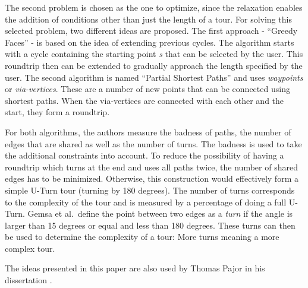 The second problem is chosen as the one to optimize, since the relaxation enables the addition of conditions other than just the length of a tour.
For solving this selected problem, two different ideas are proposed.
The first approach - \enquote{Greedy Faces} - is based on the idea of extending previous cycles.
The algorithm starts with a cycle containing the starting point \textit{s} that can be selected by the user. 
This roundtrip then can be extended to gradually approach the length specified by the user. 
The second algorithm is named \enquote{Partial Shortest Paths} and uses \textit{waypoints} or \textit{via-vertices}.
These are a number of new points that can be connected using shortest paths.
When the via-vertices are connected with each other and the start, they form a roundtrip.


For both algorithms, the authors measure the badness of paths, the number of edges that are shared as well as the number of turns.
The badness is used to take the additional constraints into account. 
To reduce the possibility of having a roundtrip which turns at the end and uses all paths twice, the number of shared edges has to be minimized.
Otherwise, this construction would effectively form a simple U-Turn tour (turning by 180 degrees).
The number of turns corresponds to the complexity of the tour and is measured by a percentage of doing a full U-Turn. 
Gemsa et al.\ define the point between two edges as a \textit{turn} if the angle is larger than 15 degrees or equal and less than 180 degrees.
These turns can then be used to determine the complexity of a tour:
More turns meaning a more complex tour.

The ideas presented in this paper are also used by Thomas Pajor in his dissertation \cite{pajor_algorithm_2013}.

